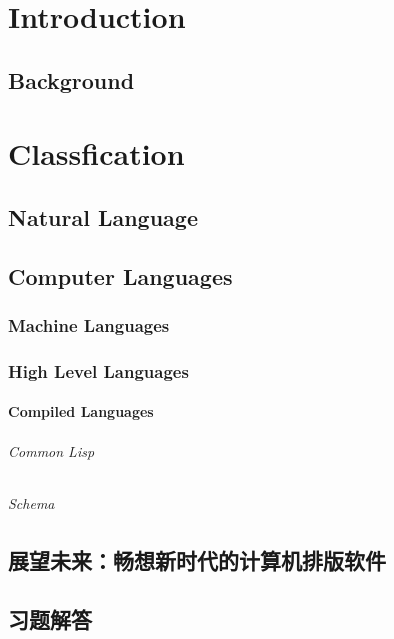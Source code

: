 \documentclass{report}
\begin{document}
		
	\part{Introduction}							%
		\chapter{Background}					%
	\part{Classfication}						%
		\chapter{Natural Language}				%
		\chapter{Computer Languages}			%
			\section{Machine Languages}			%
			\section{High Level Languages}		%
				\subsection{Compiled Languages}	%
					\paragraph{Common Lisp}
					\paragraph{Schema}
					
					
		\chapter[展望未来]{展望未来：畅想新时代的计算机排版软件}  
		
	\appendix
	\chapter{习题解答}
	
\end{document}
